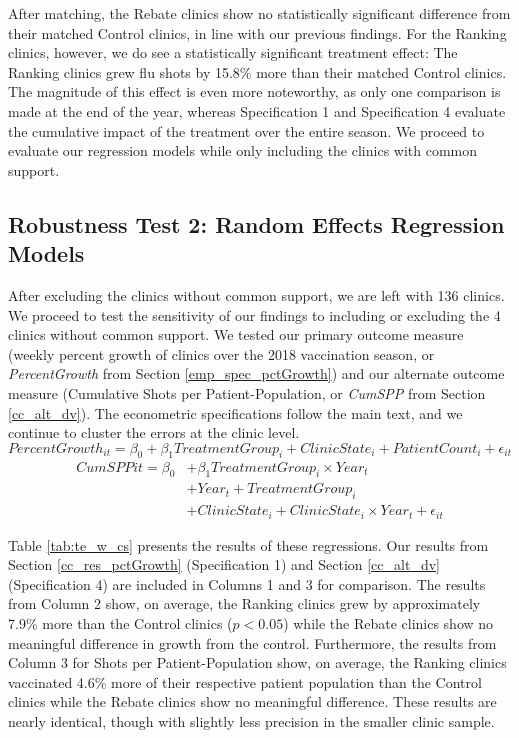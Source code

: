After matching, the Rebate clinics show no statistically significant difference from their matched Control clinics, in line with our previous findings. For the Ranking clinics, however, we do see a statistically significant treatment effect: The Ranking clinics grew flu shots by 15.8\% more than their matched Control clinics. The magnitude of this effect is even more noteworthy, as only one comparison is made at the end of the year, whereas Specification 1 and Specification 4 evaluate the cumulative impact of the treatment over the entire season. We proceed to evaluate our regression models while only including the clinics with common support.

\subsection*{Robustness Test 2: Random Effects Regression Models} 
After excluding the clinics without common support, we are left with 136 clinics. We proceed to test the sensitivity of our findings to including or excluding the 4 clinics without common support. We tested our primary outcome measure (weekly percent growth of clinics over the 2018 vaccination season, or \textit{PercentGrowth} from Section \ref{emp_spec_pctGrowth}) and our alternate outcome measure (Cumulative Shots per Patient-Population, or \textit{CumSPP} from Section \ref{cc_alt_dv}). The econometric specifications follow the main text, and we continue to cluster the errors at the clinic level.
  \begin{equation} \tag{1} %
      PercentGrowth_{it} = \beta_0 + \beta_1 TreatmentGroup_i + ClinicState_i + PatientCount_i + \epsilon_{it} 
  \end{equation}
  \begin{equation} \tag{4} \begin{split}
       CumSPP{it} = \beta_0 & + \beta_1 TreatmentGroup_i \times Year_t \\
       & + Year_t + TreatmentGroup_i \\ & + ClinicState_i + ClinicState_i \times Year_t + \epsilon_{it} 
  \end{split}  \end{equation}
  

Table \ref{tab:te_w_cs} presents the results of these regressions. Our results from Section \ref{cc_res_pctGrowth} (Specification 1) and Section \ref{cc_alt_dv} (Specification 4) are included in Columns 1 and 3 for comparison. The results from Column 2 show, on average, the Ranking clinics grew by approximately 7.9\% more than the Control clinics ($p < 0.05$) while the Rebate clinics show no meaningful difference in growth from the control. Furthermore, the results from Column 3 for Shots per Patient-Population show, on average, the Ranking clinics vaccinated 4.6\% more of their respective patient population than the Control clinics while the Rebate clinics show no meaningful difference. These results are nearly identical, though with slightly less precision in the smaller clinic sample. 

